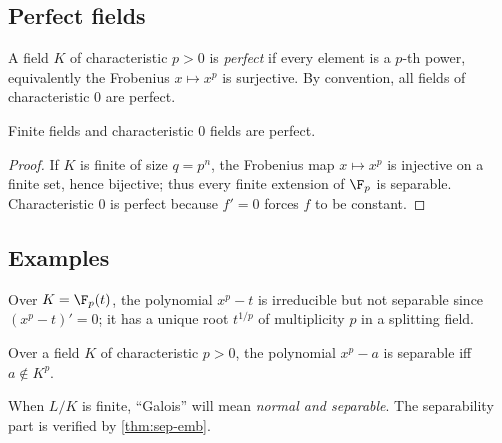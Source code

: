 \subsection{Perfect fields}
\begin{definition}
A field $K$ of characteristic $p>0$ is \emph{perfect} if every element is a $p$-th power, equivalently the Frobenius $x\mapsto x^p$ is surjective. By convention, all fields of characteristic $0$ are perfect.
\end{definition}
\begin{proposition}
Finite fields and characteristic $0$ fields are perfect.
\end{proposition}
\begin{proof}
If $K$ is finite of size $q=p^n$, the Frobenius map $x\mapsto x^p$ is injective on a finite set, hence bijective; thus every finite extension of $\F_p$ is separable. Characteristic $0$ is perfect because $f'=0$ forces $f$ to be constant.
\end{proof}

\subsection{Examples}
\begin{example}
Over $K=\F_p(t)$, the polynomial $x^p-t$ is irreducible but not separable since $(x^p-t)'=0$; it has a unique root $t^{1/p}$ of multiplicity $p$ in a splitting field.
\end{example}
\begin{example}
Over a field $K$ of characteristic $p>0$, the polynomial $x^p-a$ is separable iff $a\notin K^p$.
\end{example}

\begin{remark}
When $L/K$ is finite, ``Galois'' will mean \emph{normal and separable}. The separability part is verified by \cref{thm:sep-emb}.
\end{remark}
